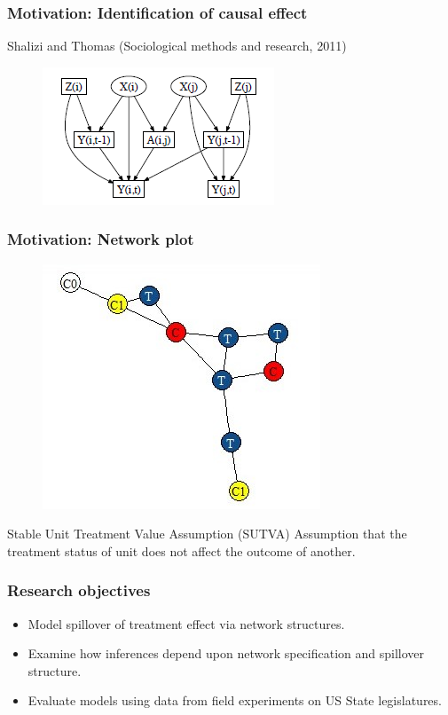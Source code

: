\documentclass{beamer}
\begin{document}
\begin{frame}
\frametitle{Motivation: Identification of causal effect}
Shalizi and Thomas (Sociological methods and research, 2011)
\begin{figure}
\includegraphics[width=0.7\linewidth]{Shalizi_diagram.png}
\end{figure}
\end{frame}


\begin{frame}
\frametitle{Motivation: Network plot}
\vspace{-5mm}
\begin{figure}
\centering
\includegraphics[width=0.5\linewidth]{Dummy_network.jpg}
\end{figure}

\vspace{-0.15cm}
\begin{block}{Stable Unit Treatment Value Assumption (SUTVA)}
Assumption that the treatment status of unit does not affect the outcome of another.
\end{block}
\end{frame}


\begin{frame}
\frametitle{Research objectives}
\begin{itemize}
\item {\LARGE Model spillover of treatment effect via network structures.}
\vspace{5mm}
\item {\LARGE Examine how inferences depend upon network specification and spillover
structure.}
\vspace{5mm}
\item {\LARGE Evaluate models using data from field experiments on US State legislatures.}
\end{itemize}
\end{frame}
\end{document}
